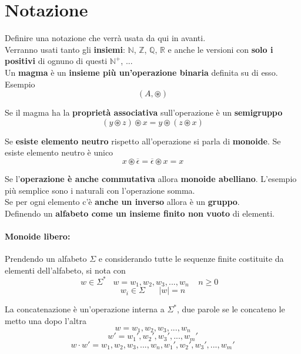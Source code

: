 
\section{Notazione}

Definire una notazione che verrà usata da qui in avanti. \\

Verranno usati tanto gli \textbf{insiemi}: $\mathbb{N}$, $\mathbb{Z}$, $\mathbb{Q}$, $\mathbb{R}$ e anche le versioni con \textbf{solo i positivi} di ognuno di questi $\mathbb{N}^+$, ... \\

Un \textbf{magma} è un \textbf{insieme più un'operazione binaria} definita su di esso. Esempio
$$ (A, \circledast) $$

Se il magma ha la \textbf{proprietà associativa} sull'operazione è un \textbf{semigruppo}
$$ (y \circledast z) \circledast x = y \circledast (z \circledast x) $$

Se \textbf{esiste elemento neutro} rispetto all'operazione si parla di \textbf{monoide}. Se esiste elemento neutro è unico
$$ x \circledast \overline{\epsilon} = \overline{\epsilon} \circledast x = x $$

Se l'\textbf{operazione è anche commutativa} allora \textbf{monoide abelliano}. L'esempio più semplice sono i naturali con l'operazione somma. \\

Se per ogni elemento c'è \textbf{anche un inverso} allora è un \textbf{gruppo}. \\

Definendo un \textbf{alfabeto come un insieme finito non vuoto} di elementi. \\

\paragraph{Monoide libero:} Prendendo un alfabeto $\Sigma$ e considerando tutte le sequenze finite costituite da elementi dell'alfabeto, si nota con 
$$w \in \Sigma^{\ast} \;\;\; w = w_1, w_2, w_3, ... , w_n \;\;\;\; n \geq 0 \;\;\;$$
$$ w_i \in \Sigma \;\;\;\;\;\; |w| = n$$

\newpage

La concatenazione è un'operazione interna a $\Sigma^{\ast}$, due parole se le concateno le metto una dopo l'altra
$$ w = w_1, w_2, w_3, ... , w_n $$ 
$$ w' = w_1', w_2', w_3', ... , w_m' $$ 
$$ w \cdot w' = w_1, w_2, w_3, ... , w_n, w_1', w_2', w_3', ... , w_m'  $$

